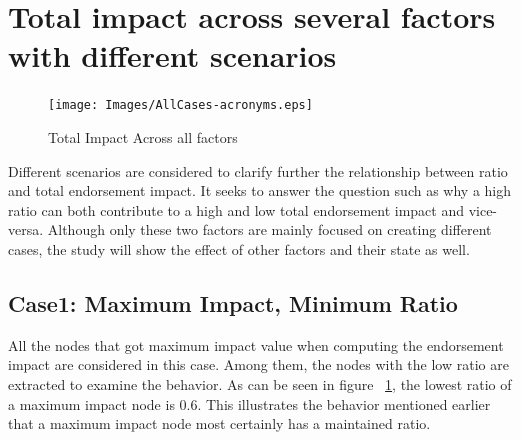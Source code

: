 \section{Total impact across several factors with different scenarios}\label{Allcases}
\begin{figure}[h]
	\texttt{[image: Images/AllCases-acronyms.eps]}
	\caption{Total Impact Across all factors}
	\label{fig:allCases}
\end{figure}
Different scenarios are considered to clarify further the relationship between
ratio and total endorsement impact. It seeks to answer the question such as why
a high ratio can both contribute to a high and low total endorsement impact and
vice-versa. Although only these two factors are mainly focused on creating
different cases, the study will show the effect of other factors and their
state as well. 
\subsection{Case1: Maximum Impact, Minimum Ratio}
All the nodes that got maximum impact value when computing the endorsement
impact are considered in this case. Among them, the nodes with the low ratio
are extracted to examine the behavior. As can be seen in figure
~\ref{fig:allCases}, the lowest ratio of a maximum impact node is 0.6. This
illustrates the behavior mentioned earlier that a maximum impact node most
certainly has a maintained ratio. 
